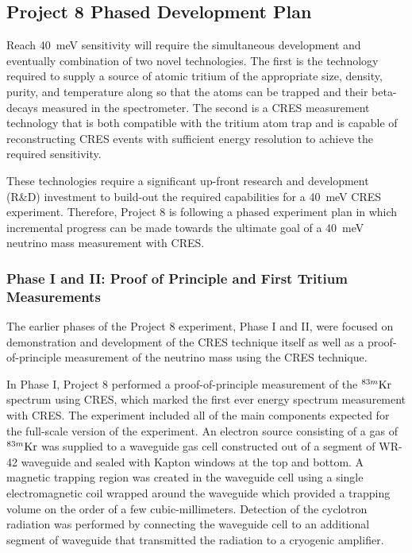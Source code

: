 \subsection{Project 8 Phased Development Plan}

Reach 40~meV sensitivity will require the simultaneous development and eventually combination of two novel technologies. The first is the technology required to supply a source of atomic tritium of the appropriate size, density, purity, and temperature along so that the atoms can be trapped and their beta-decays measured in the spectrometer. The second is a CRES measurement technology that is both compatible with the tritium atom trap and is capable of reconstructing CRES events with sufficient energy resolution to achieve the required sensitivity.

These technologies require a significant up-front research and development (R\&D) investment to build-out the required capabilities for a 40~meV CRES experiment. Therefore, Project 8 is following a phased experiment plan in which incremental progress can be made towards the ultimate goal of a 40~meV neutrino mass measurement with CRES.

\subsubsection*{Phase I and II: Proof of Principle and First Tritium Measurements}

The earlier phases of the Project 8 experiment, Phase I and II, were focused on demonstration and development of the CRES technique itself as well as a proof-of-principle measurement of the neutrino mass using the CRES technique.

In Phase I, Project 8 performed a proof-of-principle measurement of the $^{83m}\rm{Kr}$ spectrum using CRES, which marked the first ever energy spectrum measurement with CRES. The experiment included all of the main components expected for the full-scale version of the experiment. An electron source consisting of a gas of $^{83m}\rm{Kr}$ was supplied to a waveguide gas cell constructed out of a segment of WR-42 waveguide and sealed with Kapton windows at the top and bottom. A magnetic trapping region was created in the waveguide cell using a single electromagnetic coil wrapped around the waveguide which provided a trapping volume on the order of a few cubic-millimeters. Detection of the cyclotron radiation was performed by connecting the waveguide cell to an additional segment of waveguide that transmitted the radiation to a cryogenic amplifier.

